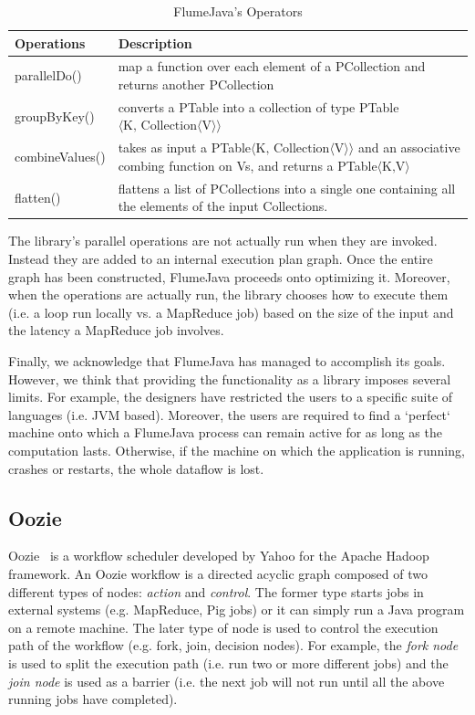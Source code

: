 \documentclass[11pt,a4paper,twoside]{report}
\begin{document}
\begin{table}[h]
\centering
\begin{tabular}{|l|p{9.8cm}|}
\hline
\textbf{Operations} & \textbf{Description} \\ \hline
parallelDo() & map a function over each element of a PCollection and returns
another PCollection \\ \hline
groupByKey() & converts a PTable into a collection of type PTable
\(\langle \text{K, Collection} \langle\text{V}\rangle\rangle\) \\ \hline
combineValues() & takes as input a PTable\(\langle \text{K, Collection}\langle
\text{V}\rangle\rangle\) and an associative combing function on Vs, and returns
a PTable\(\langle \text{K,V} \rangle\) \\ \hline
flatten() & flattens a list of PCollections into a single one containing all the
elements of the input Collections. \\ \hline
\end{tabular}
\caption{FlumeJava's Operators}
\label{tab:FlumeJavaOp}
\end{table}


The library's parallel operations are not actually run when they are invoked. Instead they are added to an internal execution plan graph. Once the entire graph has been constructed, FlumeJava proceeds onto optimizing it. Moreover, when the operations are actually run, the library chooses how to execute them (i.e. a loop run locally vs. a MapReduce job) based on the size of the input and the latency a MapReduce job involves.


Finally, we acknowledge that FlumeJava has managed to accomplish its goals. However, we think that providing the functionality as a library imposes several limits. For example, the designers have restricted the users to a specific suite  of languages (i.e. JVM based). Moreover, the users are required to find a `perfect` machine onto which a FlumeJava process can remain active for as long as the computation lasts. Otherwise, if the machine on which the application is running, crashes or restarts, the whole dataflow is lost. 

\subsection{Oozie}
Oozie~\cite{Oozie} is a workflow scheduler developed by Yahoo for the Apache Hadoop framework. An Oozie workflow is a directed acyclic graph composed of two different types of nodes: \textit{action} and \textit{control}. The former type starts jobs in external systems (e.g. MapReduce, Pig jobs) or it can simply run a Java program on a remote machine. The later type of node is used to control the execution path of the workflow (e.g. fork, join, decision nodes). For example, the  \textit{fork node} is used to split the execution path (i.e. run two or more different jobs) and the \textit{join node} is used as a barrier (i.e. the next job will not run until all the above running jobs have completed).
\end{document}
